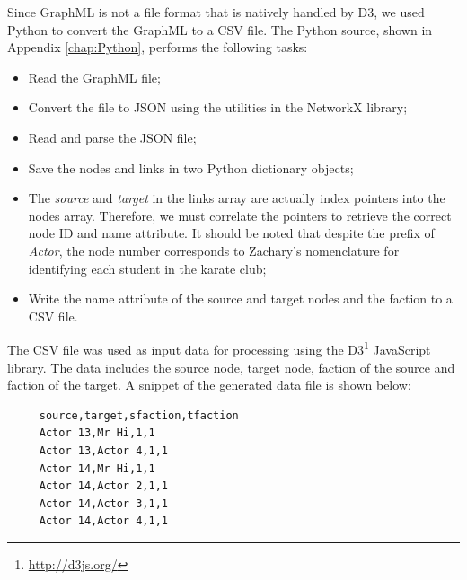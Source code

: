 \documentclass[letterpaper,11pt]{report}
\begin{document}
\begin{savenotes}
\indent{}Since GraphML is not a file format that is natively handled by D3, we used Python to convert the GraphML to a CSV file. The Python source, shown in Appendix \ref{chap:Python}, performs the following tasks:
\begin{itemize}
\item Read the GraphML file;
\item Convert the file to JSON using the utilities in the NetworkX library;
\item Read and parse the JSON file;
\item Save the nodes and links in two Python dictionary objects;
\item The \emph{source} and \emph{target} in the links array are actually index pointers into the nodes array. Therefore, we must correlate the pointers to retrieve the correct node ID and name attribute. It should be noted that despite the prefix of \emph{Actor}, the node number corresponds to Zachary's nomenclature for identifying each student in the karate club;
\item Write the name attribute of the source and target nodes and the faction to a CSV file. 
\end{itemize}

\indent{}The CSV file was used as input data for processing using the D3\footnote{\url{http://d3js.org/}} JavaScript library. The data includes the source node, target node, faction of the source and faction of the target. A snippet of the generated data file is shown below: 

\begin{verbatim}
     source,target,sfaction,tfaction
     Actor 13,Mr Hi,1,1
     Actor 13,Actor 4,1,1
     Actor 14,Mr Hi,1,1
     Actor 14,Actor 2,1,1
     Actor 14,Actor 3,1,1
     Actor 14,Actor 4,1,1
\end{verbatim}


\end{savenotes}
\end{document}
